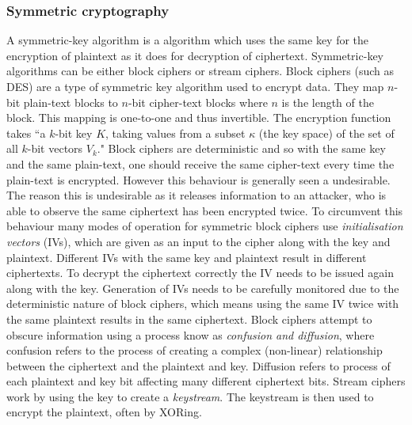 \documentclass[12pt, titlepage]{article}
\begin{document}
\subsubsection*{Symmetric cryptography}
A symmetric-key algorithm is a algorithm which uses the same key for the encryption of plaintext as it does for decryption of ciphertext. Symmetric-key algorithms can be either block ciphers or stream ciphers. Block ciphers (such as DES) are a type of symmetric key algorithm used to encrypt data. They map $n$-bit plain-text blocks to $n$-bit cipher-text blocks where $n$ is the length of the block. This mapping is one-to-one and thus invertible. The encryption function takes ``a $k$-bit key $K$, taking values from a subset $\kappa$ (the key space) of the set of all $k$-bit vectors $V_{k}$." \cite{blockCiphers}
\newline \indent Block ciphers are deterministic and so with the same key and the same plain-text, one should receive the same cipher-text every time the plain-text is encrypted. However this behaviour is generally seen a undesirable. The reason this is undesirable as it releases information to an attacker, who is able to observe the same ciphertext has been encrypted twice. To circumvent this behaviour many modes of operation for symmetric block ciphers use \textit{initialisation vectors} (IVs), which are given as an input to the cipher along with the key and plaintext. Different IVs with the same key and plaintext result in different ciphertexts. To decrypt the ciphertext correctly the IV needs to be issued again along with the key. Generation of IVs needs to be carefully monitored due to the deterministic nature of block ciphers, which means using the same IV twice with the same plaintext results in the same ciphertext.
\newline \indent Block ciphers attempt to obscure information using a process know as \textit{confusion and diffusion}, where confusion refers to the process of creating a complex (non-linear) relationship between the ciphertext and the plaintext and key. Diffusion refers to process of each plaintext and key bit affecting many different ciphertext bits.
\newline \indent Stream ciphers work by using the key to create a \textit{keystream}. The keystream is then used to encrypt the plaintext, often by XORing.
\end{document}
